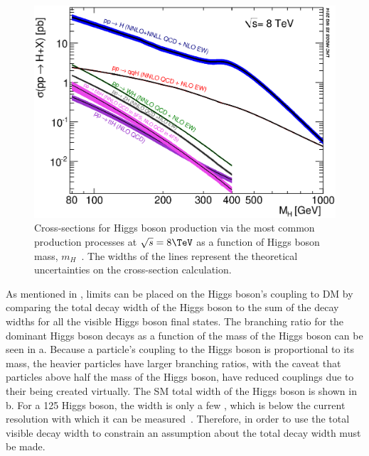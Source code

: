\begin{figure}
  \includegraphics[width=\largefigwidth]{plots/theory/XS_8TeV.eps}
  \caption{Cross-sections for Higgs boson production via the most common production processes at $\sqrt{s}=8 \TeV$ as a function of Higgs boson mass, $m_{H}$~\cite{Heinemeyer:1559921}. The widths of the lines represent the theoretical uncertainties on the cross-section calculation.}
  \label{fig:smprod}
\end{figure}

As mentioned in , limits can be placed on the Higgs boson's coupling to \ac{DM} by comparing the total decay width of the Higgs boson to the sum of the decay widths for all the visible Higgs boson final states. The branching ratio for the dominant Higgs boson decays as a function of the mass of the Higgs boson can be seen in a. Because a particle's coupling to the Higgs boson is proportional to its mass, the heavier particles have larger branching ratios, with the caveat that particles above half the mass of the Higgs boson, have reduced couplings due to their being created virtually. The \ac{SM} total width of the Higgs boson is shown in b. For a 125 \GeV Higgs boson, the width is only a few \MeV, which is below the current resolution with which it can be measured~\cite{PhysRevLett.114.191803}.
Therefore, in order to use the total visible decay width to constrain \BRinv an assumption about the total decay width must be made. 

